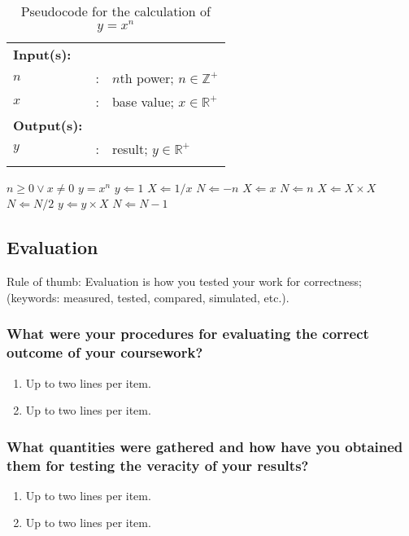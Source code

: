 \begin{table}[!b]
	\caption{Pseudocode for the calculation of $y = x^n$}
	\label{tab:calcxn}	
	\centering
	{\footnotesize
		\begin{tabular}{lll}
			\hline
			\hline
			{\bfseries Input(s):} & & \\
			$n$ & : & $n$th power; $n \in \mathbb{Z}^{+}$ \\
			$x$ & : & base value; $x \in \mathbb{R}^{+}$ \\
			\hline
			{\bfseries Output(s):} & & \\
			$y$ & : & result; $y \in \mathbb{R}^{+}$  \\
			\hline
			\hline
			\\
		\end{tabular}
	}
	\begin{algorithmic}[1]
		{\footnotesize
			\REQUIRE $n \geq 0 \vee x \neq 0$
			\ENSURE $y = x^n$
			\STATE $y \Leftarrow 1$
			\STATE $X \Leftarrow 1 / x$
			\STATE $N \Leftarrow -n$
			\ELSE
			\STATE $X \Leftarrow x$
			\STATE $N \Leftarrow n$
			\ENDIF
			\STATE $X \Leftarrow X \times X$
			\STATE $N \Leftarrow N / 2$
			\ELSE[$N$ is odd]
			\STATE $y \Leftarrow y \times X$
			\STATE $N \Leftarrow N - 1$
			\ENDIF
			\ENDWHILE
		}
	\end{algorithmic}
\end{table}







\subsection{Evaluation}
\label{sec:eval}

Rule of thumb: Evaluation is how you tested your  work for correctness; (keywords: measured, tested, compared, simulated, etc.).

\subsubsection{What were your procedures for evaluating the correct outcome of your coursework?}
\begin{enumerate}
	\item Up to two lines per item.
	\item Up to two lines per item.
\end{enumerate}

\subsubsection{What quantities were gathered and how have you obtained them for testing the veracity of your results?}
\begin{enumerate}
	\item Up to two lines per item.
	\item Up to two lines per item.
\end{enumerate}


